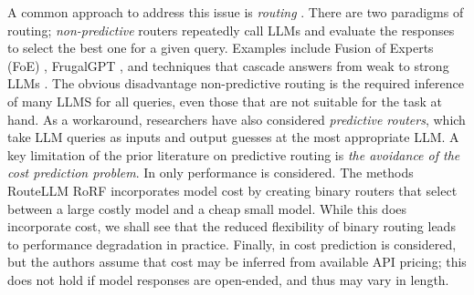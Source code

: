 


A common approach to address this issue %
is \emph{routing} \citep{shnitzer2023large, hu2024routerbench, ong2024routellmlearningroutellms, notdiamond2023rorf,akota2024}. There are two paradigms of routing; \emph{non-predictive} routers repeatedly call LLMs and evaluate the responses to select the best one for a given query. Examples include Fusion of Experts (FoE) \citep{wang2023fusing}, FrugalGPT \citep{chen2024frugalgptTMLR}, and techniques that cascade answers from weak to strong LLMs \citep{yue2024largelanguagemodelcascades}. The obvious disadvantage non-predictive routing is the required inference of many LLMS for all queries, even those that are not suitable for the task at hand. As a workaround, researchers have also considered \emph{predictive routers}, which take LLM queries as inputs and output guesses at the most appropriate LLM.  %
A key limitation of the prior literature on predictive routing is \emph{the avoidance of the cost prediction problem}. In \citet{shnitzer2023large} only performance is considered. The methods RouteLLM %
\citep{ong2024routellmlearningroutellms} RoRF \citep{notdiamond2023rorf} incorporates model cost by creating binary routers that select between a large costly model and a cheap small model. While this does incorporate cost, we shall see that the reduced flexibility of binary routing leads to performance degradation in practice. Finally, in \citet{akota2024} cost prediction is considered, but the authors assume that cost may be inferred from available API pricing; this does not hold if model responses are open-ended, and thus may vary in length. 

